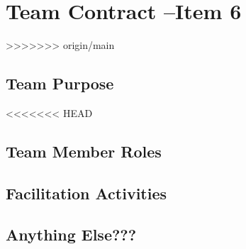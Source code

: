 \documentclass[titlepage]{article}
\begin{document}
\section{Team Contract --Item 6}
>>>>>>> origin/main

\subsection{Team Purpose}
<<<<<<< HEAD

\subsection{Team Member Roles}

\subsection{Facilitation Activities}

\subsection{Anything Else???}
\end{document}
